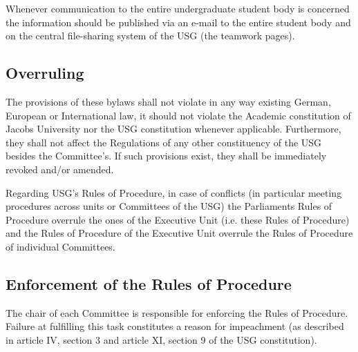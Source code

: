 Whenever communication to the entire undergraduate student body is concerned the information should be published via an e-mail to the entire student body and on the central file-sharing system of the USG (the teamwork pages).

\subsection{Overruling}\label{provision:overruling}
The provisions of these bylaws shall not violate in any way existing German, European or International law, it should not violate the Academic constitution of Jacobs University nor the USG constitution whenever applicable. Furthermore, they shall not affect the Regulations of any other constituency of the USG besides the Committee's. If such provisions exist, they shall be immediately revoked and/or amended.

Regarding USG's Rules of Procedure, in case of conflicts (in particular meeting procedures across units or Committees of the USG) the Parliaments Rules of Procedure overrule the ones of the Executive Unit (i.e. these Rules of Procedure) and the Rules of Procedure of the Executive Unit overrule the Rules of Procedure of individual Committees. 

\subsection{Enforcement of the Rules of Procedure}
The chair of each Committee is responsible for enforcing the Rules of Procedure. Failure at fulfilling this task constitutes a reason for impeachment (as described in article IV, section 3 and article XI, section 9 of the USG constitution).